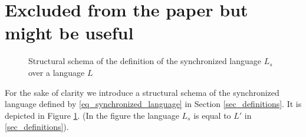 \documentclass[a4paper,oneside]{article}
\begin{document}




\newpage
\section{Excluded from the paper but might be useful}
\begin{figure}[ht]
\centering

\caption{Structural schema of the definition of the synchronized language
$L_s$ over a language $L$}
\label{fig_partitioning_synch}
\end{figure}

For the sake of clarity we introduce a structural schema of the
synchronized language defined by \ref{eq_synchronized_language} in Section
\ref{sec_definitions}. It is depicted in Figure \ref{fig_partitioning_synch}.
(In the figure the language $L_s$ is equal to $L'$ in \ref{sec_definitions}).
\end{document}
